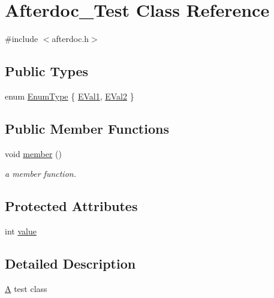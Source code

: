 \hypertarget{class_afterdoc___test}{}\section{Afterdoc\+\_\+\+Test Class Reference}
\label{class_afterdoc___test}


{\ttfamily \#include $<$afterdoc.\+h$>$}

\subsection*{Public Types}
\begin{DoxyCompactItemize}
\item 
enum \mbox{\hyperlink{class_afterdoc___test_adab0cd7ad3b4875e245ca8f6238a388a}{Enum\+Type}} \{ \mbox{\hyperlink{class_afterdoc___test_adab0cd7ad3b4875e245ca8f6238a388aae054276790e35692ad0abe10c5b75da4}{E\+Val1}}, 
\mbox{\hyperlink{class_afterdoc___test_adab0cd7ad3b4875e245ca8f6238a388aac849f37624d8d2d68ca72c4a8df9cf99}{E\+Val2}}
 \}
\end{DoxyCompactItemize}
\subsection*{Public Member Functions}
\begin{DoxyCompactItemize}
\item 
\mbox{\label{class_afterdoc___test_a57ba94e9039ee90a1b191ae0009a05dd}} 
void \mbox{\hyperlink{class_afterdoc___test_a57ba94e9039ee90a1b191ae0009a05dd}{member}} ()
\begin{DoxyCompactList}\small\item\em a member function. \end{DoxyCompactList}\end{DoxyCompactItemize}
\subsection*{Protected Attributes}
\begin{DoxyCompactItemize}
\item 
int \mbox{\hyperlink{class_afterdoc___test_a9287a08830e5cdfd9c732bb7932694a0}{value}}
\end{DoxyCompactItemize}


\subsection{Detailed Description}
\mbox{\hyperlink{class_a}{A}} test class 

